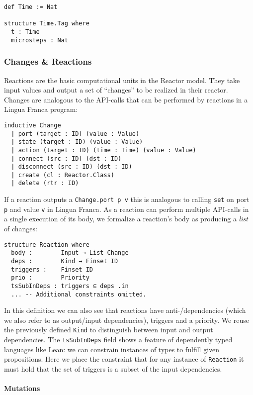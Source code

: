 \begin{lstlisting}
def Time := Nat

structure Time.Tag where 
  t : Time
  microsteps : Nat
\end{lstlisting}

\subsubsection{Changes \& Reactions}

Reactions are the basic computational units in the Reactor model. 
They take input values and output a set of ``changes'' to be realized in their reactor.
Changes are analogous to the API-calls that can be performed by reactions in a Lingua Franca program:

\begin{lstlisting}
inductive Change
  | port (target : ID) (value : Value)
  | state (target : ID) (value : Value)
  | action (target : ID) (time : Time) (value : Value)
  | connect (src : ID) (dst : ID)
  | disconnect (src : ID) (dst : ID)
  | create (cl : Reactor.Class)
  | delete (rtr : ID)
\end{lstlisting}

If a reaction outputs a \lstinline{Change.port p v} this is analogous to calling \verb|set| on port \verb|p| and value \verb|v| in Lingua Franca.
As a reaction can perform multiple API-calls in a single execution of its body, we formalize a reaction's body as producing a \emph{list} of changes:

\begin{lstlisting}
structure Reaction where
  body :        Input → List Change
  deps :        Kind → Finset ID
  triggers :    Finset ID
  prio :        Priority
  tsSubInDeps : triggers ⊆ deps .in
  ... -- Additional constraints omitted.
\end{lstlisting}

In this definition we can also see that reactions have anti-/dependencies (which we also refer to as output/input dependencies), triggers and a priority.
We reuse the previously defined \lstinline{Kind} to distinguish between input and output dependencies.
The \lstinline{tsSubInDeps} field shows a feature of dependently typed languages like Lean: we can constrain instances of types to fulfill given propositions.
Here we place the constraint that for any instance of \lstinline{Reaction} it must hold that the set of triggers is a subset of the input dependencies.

\paragraph{Mutations}

